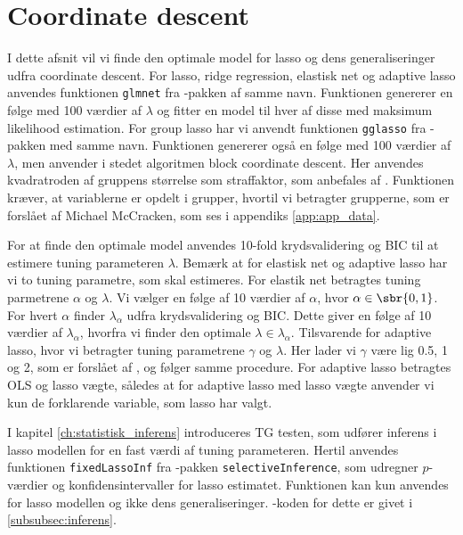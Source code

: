 \section{Coordinate descent}
I dette afsnit vil vi finde den optimale model for lasso og dens generaliseringer udfra coordinate descent.
For lasso, ridge regression, elastisk net og adaptive lasso anvendes funktionen \texttt{glmnet} fra \Rlang-pakken af samme navn.
Funktionen genererer en følge med 100 værdier af $\lambda$ og fitter en model til hver af disse med maksimum likelihood estimation.
For group lasso har vi anvendt funktionen \texttt{gglasso} fra \Rlang-pakken med samme navn. 
Funktionen genererer også en følge med 100 værdier af $\lambda$, men anvender i stedet algoritmen block coordinate descent. 
Her anvendes kvadratroden af gruppens størrelse som straffaktor, som anbefales af \citep{group_lasso}.
Funktionen kræver, at variablerne er opdelt i grupper, hvortil vi betragter grupperne, som er forslået af Michael McCracken, som ses i appendiks \ref{app:app_data}. 

For at finde den optimale model anvendes 10-fold krydsvalidering og BIC til at estimere tuning parameteren $\lambda$.
Bemærk at for elastisk net og adaptive lasso har vi to tuning parametre, som skal estimeres. 
For elastik net betragtes tuning parmetrene $\alpha$ og $\lambda$.
Vi vælger en følge af 10 værdier af \(\alpha\), hvor $\alpha \in \sbr{0,1}$.
For hvert \(\alpha\) finder \(\lambda_\alpha\) udfra krydsvalidering og BIC.
Dette giver en følge af 10 værdier af \(\lambda_\alpha\), hvorfra vi finder den optimale \(\lambda \in \lambda_\alpha\).
Tilsvarende for adaptive lasso, hvor vi betragter tuning parametrene $\gamma$ og $\lambda$.
Her lader vi $\gamma$ være lig 0.5, 1 og 2, som er forslået af \citep{adaptive_lasso}, og følger samme procedure.
For adaptive lasso betragtes OLS og lasso vægte, således at for adaptive lasso med lasso vægte anvender vi kun de forklarende variable, som lasso har valgt. 

I kapitel \ref{ch:statistisk_inferens} introduceres TG testen, som udfører inferens i lasso modellen for en fast værdi af tuning parameteren.
Hertil anvendes funktionen \texttt{fixedLassoInf} fra \Rlang-pakken \texttt{selectiveInference}, som udregner \(p\)-værdier og konfidensintervaller for lasso estimatet.
Funktionen kan kun anvendes for lasso modellen og ikke dens generaliseringer. 
\Rlang-koden for dette er givet i \ref{subsubsec:inferens}.





